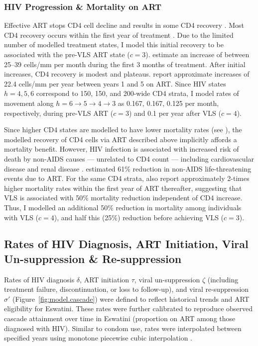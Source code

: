 \subsubsection{HIV Progression \& Mortality on ART}\label{model.par.art.hiv}
\def\hunprog{$h = 6 \rightarrow 5 \rightarrow 4 \rightarrow 3$\xspace}
Effective ART stops CD4 cell decline and results in some CD4 recovery \cite{Battegay2006,Lawn2006}.
Most CD4 recovery occurs within the first year of treatment \cite{Battegay2006}.
Due to the limited number of modelled treatment states,
I model this initial recovery to be associated with the pre-VLS ART state ($c=3$).
\citet{Lawn2006,Gabillard2013} estimate an increase of between 25--39 cells/mm per month
during the first 3 months of treatment.
After initial increases, CD4 recovery is modest and plateaus.
\citet{Battegay2006} report approximate increases of
22.4 cells/mm per year between years 1 and 5 on ART.
Since HIV states $h=4,5,6$ correspond to 150, 150, and 200-wide CD4 strata,
I model rates of movement along \hunprog as
0.167, 0.167, 0.125 per month, respectively, during pre-VLS ART ($c=3$) and
0.1 per year after VLS ($c=4$).
\par
Since higher CD4 states are modelled to have lower mortality rates (see ),
the modelled recovery of CD4 cells via ART described above implicitly affords a mortality benefit.
However, HIV infection is associated with increased risk of death by non-AIDS causes
--- \ie unrelated to CD4 count ---
including cardiovascular disease and renal disease \cite{Phillips2008}.
\citet{Lundgren2015} estimated 61\% reduction in non-AIDS life-threatening events due to ART.
For the same CD4 strata, \citet{Gabillard2013} also report approximately 2-times higher
mortality rates within the first year of ART \vs thereafter,
suggesting that VLS is associated with 50\% mortality reduction independent of CD4 increase.
Thus, I modelled an additional 50\% reduction in mortality among individuals with VLS ($c=4$),
and half this (25\%) reduction before achieving VLS ($c=3$).
\subsection{Rates of HIV Diagnosis, ART Initiation, Viral Un-suppression \& Re-suppression}\label{model.par.cascade}
Rates of HIV diagnosis $\delta$, ART initiation $\tau$, viral un-suppression $\zeta$
(including treatment failure, discontinuation, or loss to follow-up),
and viral re-suppression $\sigma'$ (Figure~\ref{fig:model.cascade})
were defined to reflect historical trends and ART eligibility for Eswatini.
These rates were further calibrated to reproduce observed cascade attainment over time in Eswatini
(\eg proportion on ART among those diagnosed with HIV).
Similar to condom use, rates were interpolated between specified years
using monotone piecewise cubic interpolation \cite{Fritsch1980}.

